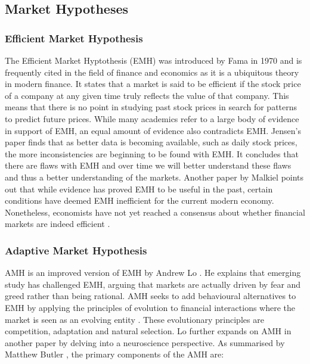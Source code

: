 \documentclass{UoYCSproject}
\begin{document}
\subsection{Market Hypotheses}
\subsubsection{Efficient Market Hypothesis}
The Efficient Market Hyptothesis (EMH) was introduced by Fama in 1970  \cite{malkiel1970efficient} and is frequently cited in the field of finance and economics as it is a ubiquitous theory in modern finance. It states that a market is said to be efficient if the stock price of a company at any given time truly reflects the value of that company. This means that there is no point in studying past stock prices in search for patterns to predict future prices. While many academics refer to a large body of evidence in support of EMH, an equal amount of evidence also contradicts EMH. Jensen's \cite{jensen1978some} paper finds that as better data is becoming available, such as daily stock prices, the more inconsistencies are beginning to be found with EMH. It concludes that there are flaws with EMH and over time we will better understand these flaws and thus a better understanding of the markets. Another paper by Malkiel \cite{malkiel2003efficient} points out that while evidence has proved EMH to be useful in the past, certain conditions have deemed EMH inefficient for the current modern economy. Nonetheless, economists have not yet reached a consensus about whether financial markets are indeed efficient \cite{lo2004adaptive}.  

\subsubsection{Adaptive Market Hypothesis}
AMH is an improved version of EMH by Andrew Lo \cite{lo2004adaptive}. He explains that emerging study has challenged EMH, arguing that markets are actually driven by fear and greed rather than being rational. AMH seeks to add behavioural alternatives to EMH by applying the principles of evolution to financial interactions where the market is seen as an evolving entity \cite{lo2004adaptive}. These evolutionary principles are competition, adaptation and natural selection. Lo further expands on AMH in another paper \cite{lo2005reconciling}
by delving into a neuroscience perspective. As summarised by Matthew Butler \cite{butler2012computational}, the primary components of the AMH are:
\end{document}
